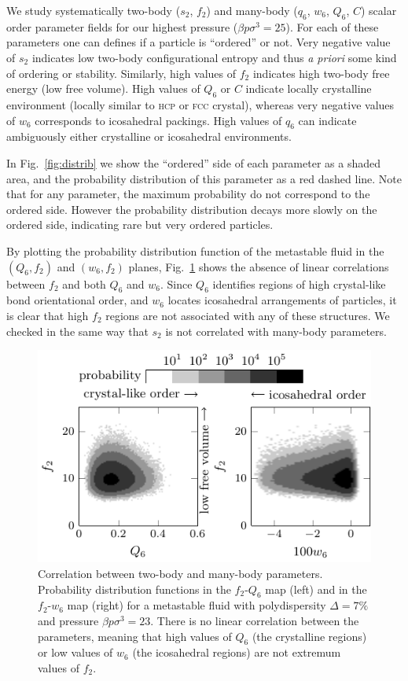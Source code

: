 \documentclass[twocolumn,superscriptaddress]{revtex4}
\begin{document}
We study systematically two-body ($s_2$, $f_2$) and many-body ($q_6$, $w_6$, $Q_6$, $C$) scalar order parameter fields for our highest pressure ($\beta p\sigma^3=25$). For each of these parameters one can defines if a particle is ``ordered'' or not. Very negative value of $s_2$ indicates low two-body configurational entropy and thus \emph{a priori} some kind of ordering or stability. Similarly, high values of $f_2$ indicates high two-body free energy (low free volume). High values of $Q_6$ or $C$ indicate locally crystalline environment (locally similar to \textsc{hcp} or \textsc{fcc} crystal), whereas very negative values of $w_6$ corresponds to icosahedral packings. High values of $q_6$ can indicate ambiguously either crystalline or icosahedral environments.

In Fig.~\ref{fig:distrib} we show the ``ordered'' side of each parameter as a shaded area, and the probability distribution of this parameter as a red dashed line. Note that for any parameter, the maximum probability do not correspond to the ordered side. However the probability distribution decays more slowly on the ordered side, indicating rare but very ordered particles.

By plotting the probability distribution function of the metastable fluid in the $(Q_6, f_2)$ and $(w_6, f_2)$ planes, Fig.~\ref{fig:f2decoupling} shows the absence of linear correlations between $f_2$ and both $Q_6$ and $w_6$. Since $Q_6$ identifies regions of high crystal-like bond orientational order, and $w_6$ locates icosahedral arrangements of particles, it is clear that high $f_2$ regions are not associated with any of these structures. We checked in the same way that $s_2$ is not correlated with many-body parameters.


\begin{figure}
 \centering
 \includegraphics{fig_f2decoupling}
 \caption{Correlation between two-body and many-body parameters. Probability distribution functions in the $f_2$-$Q_6$ map (left) and in the $f_2$-$w_6$ map (right) for a metastable fluid with polydispersity $\Delta=7\%$ and pressure $\beta p\sigma^3=23$. There is no linear correlation between the parameters, meaning
 that high values of $Q_6$ (the crystalline regions) or low values of $w_6$ (the icosahedral regions) are not extremum values of $f_2$.}
 \label{fig:f2decoupling}
\end{figure}
\end{document}

